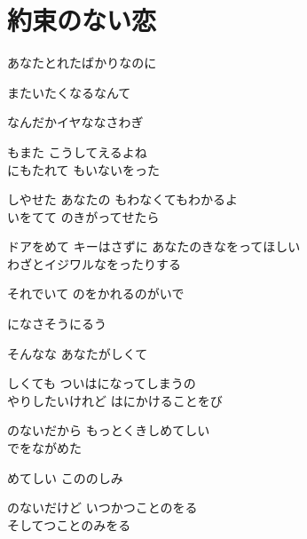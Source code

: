 \section{ 約束のない恋}
\large{

 あなたとれたばかりなのに

またいたくなるなんて

なんだかイヤななさわぎ

もまた こうしてえるよね
\\

にもたれて もいないをった

しやせた あなたの もわなくてもわかるよ
\\

いをてて のきがってせたら

ドアをめて キーはさずに あなたのきなをってほしい
\\

わざとイジワルなをったりする

それでいて のをかれるのがいで

になさそうにるう

そんなな あなたがしくて

しくても ついはになってしまうの
\\

やりしたいけれど はにかけることをび

のないだから もっとくきしめてしい
\\

でをながめた

めてしい こののしみ

のないだけど いつかつことのをる
\\

そしてつことのみをる

}